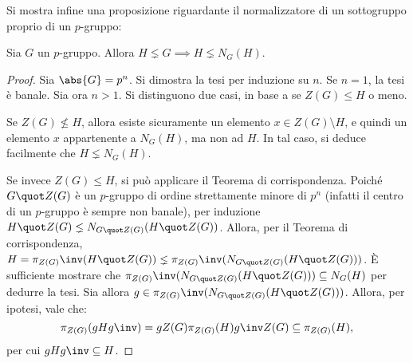 \documentclass[12pt]{scrartcl}
\begin{document}
	
	Si mostra infine una proposizione riguardante il normalizzatore
	di un sottogruppo proprio di un $p$-gruppo:
	
	\begin{proposition}
		Sia $G$ un $p$-gruppo. Allora $H \lneq G \implies
		H \lneq N_G(H)$.
	\end{proposition}
	
	\begin{proof}
		Sia $\abs{G} = p^n$. Si dimostra la tesi per induzione
		su $n$. Se $n = 1$, la tesi è banale. Sia ora $n > 1$.
		Si distinguono due casi, in base a se $Z(G) \leq H$ o
		meno. \medskip
		
		
		Se $Z(G) \nleq H$, allora esiste sicuramente un elemento
		$x \in Z(G) \setminus H$, e quindi un elemento $x$
		appartenente a $N_G(H)$, ma non ad $H$. In tal caso,
		si deduce facilmente che $H \lneq N_G(H)$. \medskip
		
		
		Se invece $Z(G) \leq H$, si può applicare il Teorema
		di corrispondenza. Poiché $G \quot Z(G)$ è un $p$-gruppo
		di ordine strettamente minore di $p^n$ (infatti il
		centro di un $p$-gruppo è sempre non banale), per
		induzione $H \quot Z(G) \lneq N_{G \quot Z(G)}(H \quot Z(G))$.
		Allora, per il Teorema di corrispondenza,
		$H = \pi_{Z(G)}\inv(H \quot Z(G)) \lneq \pi_{Z(G)}\inv(
		N_{G \quot Z(G)}(H \quot Z(G)))$. È sufficiente mostrare
		che $\pi_{Z(G)}\inv(
		N_{G \quot Z(G)}(H \quot Z(G))) \subseteq N_G(H)$ per
		dedurre la tesi. Sia allora $g \in \pi_{Z(G)}\inv(
		N_{G \quot Z(G)}(H \quot Z(G)))$. Allora, per ipotesi,
		vale che:
		\[ \pi_{Z(G)}(gHg\inv) = g Z(G) \pi_{Z(G)}(H) g\inv Z(G) \subseteq \pi_{Z(G)}(H), \]
		per cui $gHg\inv \subseteq H$.
	\end{proof}
\end{document}
